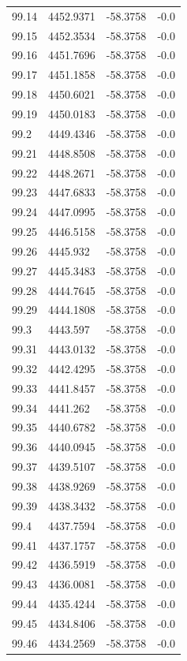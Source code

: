 \begin{table}[H]
\begin{tabular}{llll}
99.14 & 4452.9371 & -58.3758 & -0.0 \\
99.15 & 4452.3534 & -58.3758 & -0.0 \\
99.16 & 4451.7696 & -58.3758 & -0.0 \\
99.17 & 4451.1858 & -58.3758 & -0.0 \\
99.18 & 4450.6021 & -58.3758 & -0.0 \\
99.19 & 4450.0183 & -58.3758 & -0.0 \\
99.2 & 4449.4346 & -58.3758 & -0.0 \\
99.21 & 4448.8508 & -58.3758 & -0.0 \\
99.22 & 4448.2671 & -58.3758 & -0.0 \\
99.23 & 4447.6833 & -58.3758 & -0.0 \\
99.24 & 4447.0995 & -58.3758 & -0.0 \\
99.25 & 4446.5158 & -58.3758 & -0.0 \\
99.26 & 4445.932 & -58.3758 & -0.0 \\
99.27 & 4445.3483 & -58.3758 & -0.0 \\
99.28 & 4444.7645 & -58.3758 & -0.0 \\
99.29 & 4444.1808 & -58.3758 & -0.0 \\
99.3 & 4443.597 & -58.3758 & -0.0 \\
99.31 & 4443.0132 & -58.3758 & -0.0 \\
99.32 & 4442.4295 & -58.3758 & -0.0 \\
99.33 & 4441.8457 & -58.3758 & -0.0 \\
99.34 & 4441.262 & -58.3758 & -0.0 \\
99.35 & 4440.6782 & -58.3758 & -0.0 \\
99.36 & 4440.0945 & -58.3758 & -0.0 \\
99.37 & 4439.5107 & -58.3758 & -0.0 \\
99.38 & 4438.9269 & -58.3758 & -0.0 \\
99.39 & 4438.3432 & -58.3758 & -0.0 \\
99.4 & 4437.7594 & -58.3758 & -0.0 \\
99.41 & 4437.1757 & -58.3758 & -0.0 \\
99.42 & 4436.5919 & -58.3758 & -0.0 \\
99.43 & 4436.0081 & -58.3758 & -0.0 \\
99.44 & 4435.4244 & -58.3758 & -0.0 \\
99.45 & 4434.8406 & -58.3758 & -0.0 \\
99.46 & 4434.2569 & -58.3758 & -0.0 \\

\end{tabular}
\end{table}
